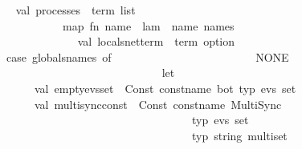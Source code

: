 \begin{isabellebody}
\ \ \isanewline
\ \ \ \ \ \ \ \ \ \ \ \ \ \ \ \ \ \ \ val\ processes\ {\isacharcolon}{\kern0pt}\ term\ list\ {\isacharequal}{\kern0pt}\isanewline
\ \ \ \ \ \ \ \ \ \ \ \ \ \ \ \ \ \ \ \ \ \ \ \ \ \ \ \ \ \ map\ {\isacharparenleft}{\kern0pt}fn\ name\ {\isacharequal}{\kern0pt}{\isachargreater}{\kern0pt}\ lam\ {\isachardollar}{\kern0pt}\ name{\isacharparenright}{\kern0pt}\ names\isanewline
\ \ \ \ \ \ \ \ \ \ \ \ \isanewline
\ \ \ \ \ \ \ \ \ \ \ \ \ \ \ \ \ \ \ \ val\ locals{\isacharunderscore}{\kern0pt}net{\isacharunderscore}{\kern0pt}term\ {\isacharcolon}{\kern0pt}\ term\ option\ {\isacharequal}{\kern0pt}\isanewline
\ \ \ \ \ \ \ \ \ \ \ \ \ \ \ \ \ \ \ \ {\isacharparenleft}{\kern0pt}case\ globals{\isacharunderscore}{\kern0pt}names\ of\isanewline
\ \ \ \ \ \ \ \ \ \ \ \ \ \ \ \ \ \ \ \ \ \ \ {\isacharbrackleft}{\kern0pt}{\isacharbrackright}{\kern0pt}\ {\isacharequal}{\kern0pt}{\isachargreater}{\kern0pt}\ NONE\isanewline
\ \ \ \ \ \ \ \ \ \ \ \ \ \ \ \ \ \ \ \ \ {\isacharbar}{\kern0pt}\ {\isacharunderscore}{\kern0pt}\ {\isacharequal}{\kern0pt}{\isachargreater}{\kern0pt}\ \isanewline
\ \ \ \ \ \ \ \ \ \ \ \ \ \ \ \ \ \ \ \ \ \ \ let\isanewline
\ \ \ \ \ \ \ \ \ \ \ \ \ \ \ \ \ \ \ \ \ \ \ \ \ val\ empty{\isacharunderscore}{\kern0pt}evs{\isacharunderscore}{\kern0pt}set\ {\isacharequal}{\kern0pt}\ Const\ {\isacharparenleft}{\kern0pt}{\isacharat}{\kern0pt}{\isacharbraceleft}{\kern0pt}const{\isacharunderscore}{\kern0pt}name\ bot{\isacharbraceright}{\kern0pt}{\isacharcomma}{\kern0pt}\ {\isacharat}{\kern0pt}{\isacharbraceleft}{\kern0pt}typ\ {\isachardoublequote}{\kern0pt}evs\ set{\isachardoublequote}{\kern0pt}{\isacharbraceright}{\kern0pt}{\isacharparenright}{\kern0pt}\isanewline
\ \ \ \ \ \ \ \ \ \ \ \ \ \ \ \ \ \ \ \ \ \ \ \ \ val\ multisync{\isacharunderscore}{\kern0pt}const\ {\isacharequal}{\kern0pt}\ Const\ {\isacharparenleft}{\kern0pt}{\isacharat}{\kern0pt}{\isacharbraceleft}{\kern0pt}const{\isacharunderscore}{\kern0pt}name\ MultiSync{\isacharbraceright}{\kern0pt}{\isacharcomma}{\kern0pt}\ \isanewline
\ \ \ \ \ \ \ \ \ \ \ \ \ \ \ \ \ \ \ \ \ \ \ \ \ \ \ \ \ \ \ \ \ \ \ \ \ \ \ \ \ \ \ \ \ \ \ \ \ \ \ \ \ {\isacharat}{\kern0pt}{\isacharbraceleft}{\kern0pt}typ\ {\isachardoublequote}{\kern0pt}evs\ set{\isachardoublequote}{\kern0pt}{\isacharbraceright}{\kern0pt}\ {\isacharminus}{\kern0pt}{\isacharminus}{\kern0pt}{\isachargreater}{\kern0pt}\ \isanewline
\ \ \ \ \ \ \ \ \ \ \ \ \ \ \ \ \ \ \ \ \ \ \ \ \ \ \ \ \ \ \ \ \ \ \ \ \ \ \ \ \ \ \ \ \ \ \ \ \ \ \ \ \ {\isacharat}{\kern0pt}{\isacharbraceleft}{\kern0pt}typ\ {\isachardoublequote}{\kern0pt}string\ multiset{\isachardoublequote}{\kern0pt}{\isacharbraceright}{\kern0pt}\ {\isacharminus}{\kern0pt}{\isacharminus}{\kern0pt}{\isachargreater}{\kern0pt}\ \isanewline

\end{isabellebody}
